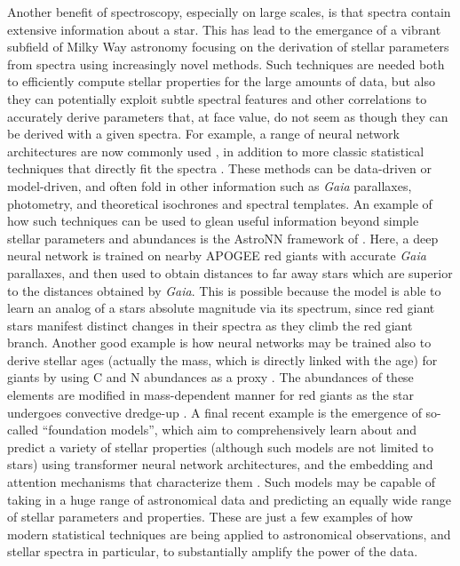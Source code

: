Another benefit of spectroscopy, especially on large scales, is that spectra contain extensive information about a star. This has lead to the emergance of a vibrant subfield of Milky Way astronomy focusing on the derivation of stellar parameters from spectra using increasingly novel methods. Such techniques are needed both to efficiently compute stellar properties for the large amounts of data, but also they can potentially exploit subtle spectral features and other correlations to accurately derive parameters that, at face value, do not seem as though they can be derived with a given spectra. For example, a range of neural network architectures are now commonly used \parencite[e.g.][]{leung19a,leung19b,ting19}, in addition to more classic statistical techniques that directly fit the spectra \parencite[e.g.][]{ness15,queiroz18,cargile20}. These methods can be data-driven or model-driven, and often fold in other information such as \textit{Gaia} parallaxes, photometry, and theoretical isochrones and spectral templates. An example of how such techniques can be used to glean useful information beyond simple stellar parameters and abundances is the AstroNN framework of \textcite{leung19b}. Here, a deep neural network is trained on nearby APOGEE red giants with accurate \textit{Gaia} parallaxes, and then used to obtain distances to far away stars which are superior to the distances obtained by \textit{Gaia}. This is possible because the model is able to learn an analog of a stars absolute magnitude via its spectrum, since red giant stars manifest distinct changes in their spectra as they climb the red giant branch. Another good example is how neural networks may be trained also to derive stellar ages (actually the mass, which is directly linked with the age) for giants by using C and N abundances as a proxy \parencite{leung23}. The abundances of these elements are modified in mass-dependent manner for red giants as the star undergoes convective dredge-up \parencite{martig16}. A final recent example is the emergence of so-called ``foundation models'', which aim to comprehensively learn about and predict a variety of stellar properties (although such models are not limited to stars) using transformer neural network architectures, and the embedding and attention mechanisms that characterize them \parencite[e.g.][]{leung24}. Such models may be capable of taking in a huge range of astronomical data and predicting an equally wide range of stellar parameters and properties. These are just a few examples of how modern statistical techniques are being applied to astronomical observations, and stellar spectra in particular, to substantially amplify the power of the data.

